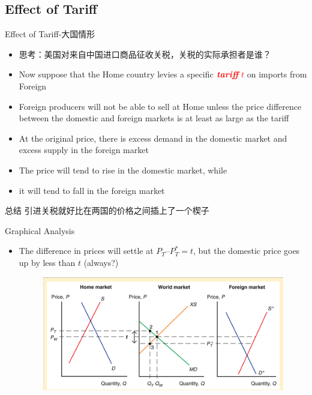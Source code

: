 \documentclass[10pt,hyperref={CJKbookmarks=true},xcolor=dvipsnames,aspectratio=169]{beamer}
\begin{document}
\subsection{Effect of Tariff}
\begin{frame}{Effect of Tariff-大国情形}

\begin{itemize}
	\item 思考：美国对来自中国进口商品征收关税，关税的实际承担者是谁？
\item Now suppose that the Home country levies a specific\textbf{\textcolor{red}{\emph{
tariff}}} \textbf{\textcolor{red}{\emph{$t$}}} on imports from Foreign 
\item Foreign producers will not be able to sell at Home unless the price
difference between the domestic and foreign markets is at least as
large as the tariff 
\item At the original price, there is excess demand in the domestic market
and excess supply in the foreign market 
\item The price will tend to rise in the domestic market, while 
\item it will tend to fall in the foreign market
\end{itemize}
 \begin{block}{总结}
 	引进关税就好比在两国的价格之间插上了一个楔子
 \end{block}

\end{frame}

\begin{frame}{Graphical Analysis}

\begin{itemize}
\item The difference in prices will settle at $P_{T}–P_{T}^{*}=t$,
but the domestic price goes up by less than $t$ (always?)
\begin{figure}


\includegraphics[scale=0.4]{fig/instruments/lec07-7}
\end{figure}

\end{itemize}
\end{frame}
\end{document}
